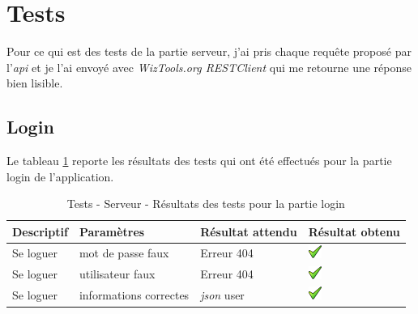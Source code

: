 
\section{Tests}

Pour ce qui est des tests de la partie serveur, j'ai pris chaque requête proposé par l'\emph{\gls{api}} et je l'ai envoyé avec \emph{WizTools.org RESTClient} qui me retourne une réponse bien lisible.
\subsection{Login} %
\label{sub:login}
Le tableau \ref{tab:stestLogin} reporte les résultats des tests qui ont été effectués pour la partie login de l'application.
\begin{table}[H]
\begin{tabularx}{\textwidth}{|X|X|X|X|}
  \hline
  \bf{Descriptif} & \bf{Paramètres} & \bf{Résultat attendu} & \bf{Résultat obtenu}\\
  \hline
   Se loguer & mot de passe faux & Erreur 404 & \includegraphics[width=16px]{00_media/ok.png} \\
  \hline
     Se loguer & utilisateur faux & Erreur 404 & \includegraphics[width=16px]{00_media/ok.png} \\
  \hline
       Se loguer & informations correctes & \emph{\gls{json}} user & \includegraphics[width=16px]{00_media/ok.png} \\
  \hline
\end{tabularx}
\caption{Tests - Serveur - Résultats des tests pour la partie login}
\label{tab:stestLogin}
\end{table}
